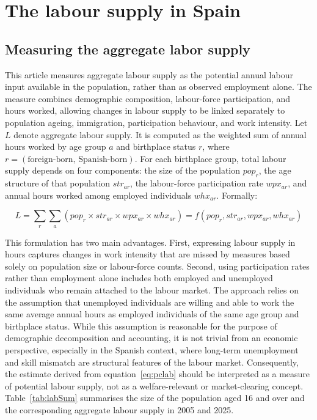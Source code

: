 \section{The labour supply in Spain}\label{sec:lab_method}

\subsection{Measuring the aggregate labor supply}

This article measures aggregate labour supply as the potential annual labour input available in the population, rather than as observed employment alone. The measure combines demographic composition, labour-force participation, and hours worked, allowing changes in labour supply to be linked separately to population ageing, immigration, participation behaviour, and work intensity. Let \(L\) denote aggregate labour supply. It is computed as the weighted sum of annual hours worked by age group \(a\) and birthplace status \(r\), where \(r = (\text{foreign-born, Spanish-born})\). For each birthplace group, total labour supply depends on four components: the size of the population \(pop_{r}\), the age structure of that population \(str_{ar}\), the labour-force participation rate \(wpx_{ar}\), and annual hours worked among employed individuals \(whx_{ar}\). Formally:

\begin{equation}\label{eq:pclab}
  L = \displaystyle\sum_{r}\displaystyle\sum_{a}(pop_{r} \times str_{ar} \times wpx_{ar} \times whx_{ar}) = f(pop_{r}, str_{ar}, wpx_{ar}, whx_{ar})
\end{equation}


This formulation has two main advantages. First, expressing labour supply in hours captures changes in work intensity that are missed by measures based solely on population size or labour-force counts. Second, using participation rates rather than employment alone includes both employed and unemployed individuals who remain attached to the labour market. The approach relies on the assumption that unemployed individuals are willing and able to work the same average annual hours as employed individuals of the same age group and birthplace status. While this assumption is reasonable for the purpose of demographic decomposition and accounting, it is not trivial from an economic perspective, especially in the Spanish context, where long-term unemployment and skill mismatch are structural features of the labour market. Consequently, the estimate derived from equation~\eqref{eq:pclab} should be interpreted as a measure of potential labour supply, not as a welfare-relevant or market-clearing concept. Table~\ref{tab:labSum} summarises the size of the population aged 16 and over and the corresponding aggregate labour supply in 2005 and 2025.



